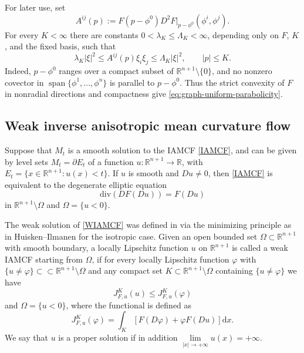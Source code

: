 \documentclass[10pt,a4paper]{amsart}
\numberwithin{equation}{section}
\begin{document}
	For later use, set
	\begin{equation}
	\label{eq:graph-coefficients}
	 A^{ij}(p):=F(p-\phi^0)D^2F|_{p-\phi^0}(\phi^i,\phi^j).
	\end{equation}
	For every $K<\infty$ there are constants $0<\lambda_K\leq\Lambda_K<\infty$, depending only on $F$, $K$, and the fixed basis, such that
	\begin{equation}
	\label{eq:graph-uniform-parabolicity}
	 \lambda_K|\xi|^2\leq A^{ij}(p)\xi_i\xi_j
	 \leq\Lambda_K|\xi|^2,
	 \qquad |p|\leq K.
	\end{equation}
	Indeed, $p-\phi^0$ ranges over a compact subset of $\mathbb R^{n+1}\setminus\{0\}$, and no nonzero covector in $\operatorname{span}\{\phi^1,\ldots,\phi^n\}$ is parallel to $p-\phi^0$. Thus the strict convexity of $F$ in nonradial directions and compactness give \eqref{eq:graph-uniform-parabolicity}.
	
	\subsection{Weak inverse anisotropic mean curvature flow} \label{sec.2-wiamcf}

Suppose that $M_t$ is a smooth solution to the IAMCF \eqref{IAMCF}, and can be given by level sets $M_t=\partial E_t$ of a function $u:\mathbb{R}^{n+1} \to \mathbb{R}$, with $E_t=\{x\in\mathbb{R}^{n+1}:u(x)<t\}$. If $u$ is smooth and $Du\neq 0$, then \eqref{IAMCF} is equivalent to the degenerate elliptic equation 
\begin{equation}\label{WIAMCF}
    \text{div}(DF(Du))=F(Du)
\end{equation}
in $\mathbb{R}^{n+1}\setminus \Omega$ and $\Omega=\{u<0\}$. 


The weak solution of \eqref{WIAMCF} was defined in \cite{DGX23} via the minimizing principle as in Huisken--Ilmanen \cite{HI01} for the isotropic case.  
Given an open bounded set $\Omega\subset \mathbb{R}^{n+1}$ with smooth boundary, a locally Lipschitz function $u$ on $\mathbb{R}^{n+1}$ is called a weak IAMCF starting from $\Omega$, if for every locally Lipschitz function $\varphi$  with $\{u\neq\varphi\}\subset\subset \mathbb{R}^{n+1}\setminus\Omega$ and any compact set $K\subset \mathbb{R}^{n+1}\setminus\Omega$ containing $\{u\neq\varphi\}$ we have 
  \begin{equation*}
        J_{F,u}^K(u) \leq J_{F,u}^K(\varphi)
    \end{equation*}
and $\Omega=\{u<0\}$, where the functional is defined as 
 \begin{equation*}
        J_{F,u}^K(\varphi) = \int_{K} \left[ F(D\varphi)+\varphi F(Du) \right] \mathrm{d}x.
\end{equation*}
 We say that $u$ is a proper solution if in addition $\lim\limits_{|x|\to+\infty}u(x)=+\infty$.
\end{document}
